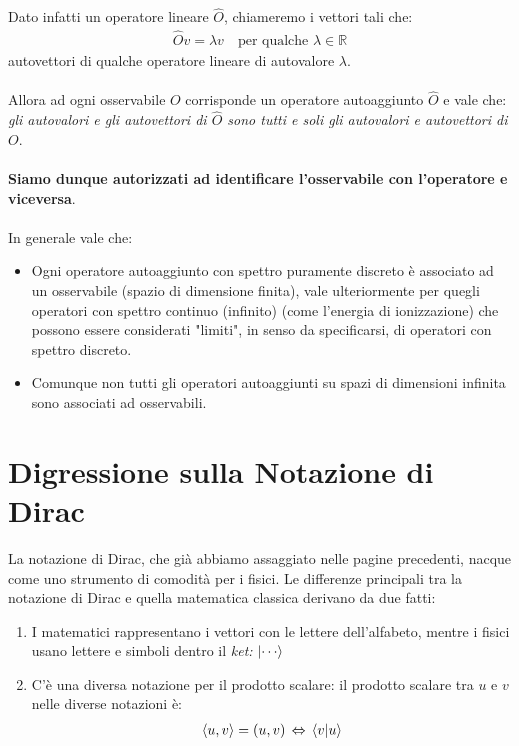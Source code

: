 \begin{enumerate}[label=\arabic*)]
	Dato infatti un operatore lineare $\hat{O}$, chiameremo i vettori tali che:
	\begin{align*}
		\hat{O}v = \lambda v \quad \text{per qualche } \lambda \in \mathbb{R}
	\end{align*}
		autovettori di qualche operatore lineare di autovalore $\lambda$.
	\\
	\\
		Allora ad ogni osservabile $O$ corrisponde un operatore autoaggiunto $\hat{O}$ e vale che: \textit{gli autovalori e gli autovettori di $\hat{O}$ sono tutti e soli gli autovalori e autovettori di $O$}.
	\\
	\\
		\textbf{Siamo dunque autorizzati ad identificare l'osservabile con l'operatore e viceversa}. 
	\\
	\\
		In generale vale che:
	\begin{itemize}
		\item Ogni operatore autoaggiunto con spettro puramente discreto è associato ad un osservabile (spazio di dimensione finita), vale ulteriormente per quegli operatori con spettro continuo (infinito) (come l'energia di ionizzazione) che possono essere considerati "limiti", in senso da specificarsi, di operatori con spettro discreto.
		\item Comunque non tutti gli operatori autoaggiunti su spazi di dimensioni infinita sono associati ad osservabili.
	\end{itemize}
\end{enumerate}
	
\section{Digressione sulla Notazione di Dirac}

	La notazione di Dirac, che già abbiamo assaggiato nelle pagine precedenti, nacque come uno strumento di comodità per i fisici. Le differenze principali tra la notazione di Dirac e quella matematica classica derivano da due fatti:
	
\begin{enumerate}[label=\arabic*)]
	\item I matematici rappresentano i vettori con le lettere dell'alfabeto, mentre i fisici usano lettere e simboli dentro il \textit{ket:} $\ket{\cdots}$
	\item C'è una diversa notazione per il prodotto scalare: il prodotto scalare tra $u$ e $v$ nelle diverse notazioni è:
	\begin{align*}
		\langle u, v \rangle = \qty(u, v) \,\Leftrightarrow \, \braket{v}{u}
	\end{align*}
\end{enumerate}

